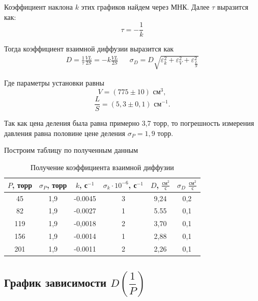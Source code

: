 \documentclass[a4paper,12pt]{article}
\begin{document}
    Коэффициент наклона $k$ этих графиков найдем через МНК. Далее $\tau$ выразится как:
    \[ \tau = -\dfrac{1}{k} \]



    Тогда коэффициент взаимной диффузии выразится как
    \begin{align}
		D = \frac{1}{\tau}\frac{VL}{2S} = -k \frac{VL}{2S} & & \sigma_D = D\sqrt{\varepsilon_k^2 + \varepsilon_V^2  + \varepsilon_{\frac{L}{S}}^2}
	\end{align}

    Где параметры установки равны 
    \[ V = (775 \pm 10) \text{ см}^3,\] \[ \frac{L}{S} = (5,3 \pm 0,1) \text{ см}^{-1}. \]
    
    Так как цена деления была равна примерно 3,7 торр, то погрешность измерения давления равна половине цене деления $\sigma_P = 1,9$ торр.
    
    Построим таблицу по полученным данным

    \begin{table}[!h]
        \centering
        \begin{tabular}{|c|c|c|c|c|c|}
            \hline
            $ P $, торр & $ \sigma_P $, торр & $ k $, с$ ^{-1} $ & $ \sigma_{k} \cdot 10^{-6} $, с$ ^{-1} $ & $ D $, $\frac{\text{см}^2}{\text{с}}$ & $ \sigma_D $ $\frac{\text{см}^2}{\text{с}}$ \\ \hline
            45 & 1,9 & -0.0045 & 3 & 9,24 & 0,2 \\ \hline
            82& 1,9 & -0.0027 & 1 & 5.55 & 0,1 \\ \hline
            119 & 1,9 & -0,0018 & 2 & 3,70 & 0,1 \\ \hline
            156 & 1,9 & -0.0014 & 1 & 2,88 & 0,1 \\ \hline
            201 & 1,9 & -0.0011 & 2 & 2,26 & 0,1 \\ \hline
        \end{tabular}
        \caption{Получение коэффициента взаимной диффузии}
    \end{table}

    \subsection*{График зависимости $D(\dfrac{1}{P})$}
\end{document}
